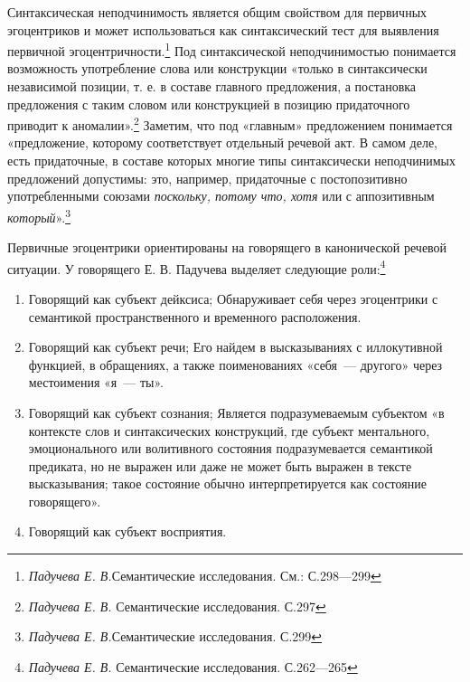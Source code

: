 \documentclass{kursa4}
\begin{document}
      Синтаксическая неподчинимость является общим свойством для первичных эгоцентриков и может использоваться как синтаксический тест для выявления первичной эгоцентричности.\footnote{\textit{Падучева Е. В.}Семантические исследования. См.: С.298—299} Под синтаксической неподчинимостью понимается возможность употребление слова или конструкции «только в синтаксически независимой позиции, т. е. в составе главного предложения, а постановка предложения с таким словом или конструкцией в позицию придаточного приводит к аномалии».\footnote{\textit{ Падучева Е. В. }Семантические исследования. С.297} Заметим, что под «главным» предложением понимается «предложение, которому соответствует отдельный речевой акт. В самом деле, есть придаточные, в составе которых многие типы синтаксически неподчинимых предложений допустимы: это, например, придаточные с постопозитивно употребленными союзами \textit{поскольку, потому что, хотя} или с аппозитивным \textit{который}».\footnote{\textit{Падучева Е. В.}Семантические исследования. С.299}

      Первичные эгоцентрики ориентированы на говорящего в канонической речевой ситуации. У говорящего Е. В. Падучева выделяет следующие роли:\footnote{\textit{Падучева Е. В.} Семантические исследования. С.262—265}

      \begin{enumerate}

        \item Говорящий как субъект дейксиса; \newline
        Обнаруживает себя через эгоцентрики с семантикой пространственного и временного расположения. 

        \item Говорящий как субъект речи; \newline
        Его найдем в высказываниях с иллокутивной функцией, в обращениях, а также поименованиях «себя~--- другого» через местоимения «я~--- ты». \item Говорящий как субъект сознания; \newline
        Является подразумеваемым субъектом «в контексте слов и синтаксических конструкций, где субъект ментального, эмоционального или волитивного состояния подразумевается семантикой предиката, но не выражен или даже не может быть выражен в тексте высказывания; такое состояние обычно интерпретируется как состояние говорящего». 

        \item Говорящий как субъект восприятия. \end{enumerate}
\end{document}
